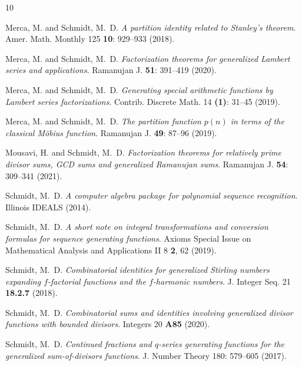 \documentclass[10pt,reqno,letterpaper]{article}
\theoremstyle{plain}
\numberwithin{theorem}{section}
\theoremstyle{definition}
\newcounter{completeBibitemIncrementCtr}
\renewenvironment{thebibliography}[1]{
     \renewcommand{\refname}{} 
     
     \begin{oldthebibliography}{#1}
     \setlength{\itemsep}{-0.6mm}
     \setlength{\parskip}{0em}
     \setlength{\topsep}{0pt}
     \setlength{\partopsep}{0pt}
     \setcounter{enumiv}{\value{completeBibitemIncrementCtr}}
     \normalsize%
}
{
     \setcounter{completeBibitemIncrementCtr}{\value{enumiv}}
     \end{oldthebibliography}
}
\begin{document}
\vskip -4mm
\begin{thebibliography}{10}

Merca, M. and Schmidt, M.~D. \emph{A partition identity related to Stanley's theorem}. 
Amer. Math. Monthly 125 {\bf 10}: 929--933 (2018). 

Merca, M. and Schmidt, M.~D. \emph{Factorization theorems for generalized Lambert series and applications}. 
Ramanujan J. {\bf 51}: 391--419 (2020). 

Merca, M. and Schmidt, M.~D. \emph{Generating special arithmetic functions by Lambert series factorizations}. 
Contrib. Discrete Math. 14 {\bf (1)}: 31--45 (2019). 

Merca, M. and Schmidt, M.~D. \emph{The partition function $p(n)$ in terms of the classical M\"{o}bius function}. 
Ramanujan J. {\bf 49}: 87--96 (2019). 

Mousavi, H. and Schmidt, M.~D. \emph{Factorization theorems for relatively prime divisor sums, 
                                     GCD sums and generalized Ramanujan sums}. 
Ramanujan J. {\bf 54}: 309--341 (2021). 

Schmidt, M.~D. \emph{A computer algebra package for polynomial sequence recognition}. 
Illinois IDEALS (2014). 

Schmidt, M.~D. \emph{A short note on integral transformations and 
                     conversion formulas for sequence generating functions}. 
Axioms Special Issue on Mathematical Analysis and Applications II 8 {\bf 2}, 62 (2019). 

Schmidt, M.~D. \emph{Combinatorial identities for generalized Stirling numbers 
                     expanding $f$-factorial functions and the $f$-harmonic numbers}. 
J. Integer Seq. 21 {\bf 18.2.7} (2018). 

Schmidt, M.~D. \emph{Combinatorial sums and identities involving generalized divisor functions with bounded divisors}. 
Integers 20 {\bf A85} (2020). 

Schmidt, M.~D. \emph{Continued fractions and $q$-series generating functions for the 
                     generalized sum-of-divisors functions}. 
J. Number Theory 180: 579--605 (2017). 


\end{thebibliography}
\end{document}
